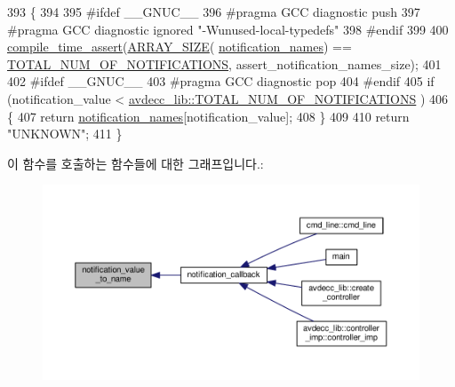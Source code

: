 \begin{DoxyCode}
393     \{
394 
395 \textcolor{preprocessor}{#ifdef \_\_GNUC\_\_}
396 \textcolor{preprocessor}{#pragma GCC diagnostic push}
397 \textcolor{preprocessor}{#pragma GCC diagnostic ignored "-Wunused-local-typedefs"}
398 \textcolor{preprocessor}{#endif}
399 
400         \hyperlink{cassert_8h_a6768e6dd0c70e296cb9d0ea13a89ec02}{compile\_time\_assert}(\hyperlink{cassert_8h_a6242a25f9d996f0cc4f4cdb911218b75}{ARRAY\_SIZE}(
      \hyperlink{namespaceavdecc__lib_1_1utility_a0ac9ebfa3d02f075ec4fbfc360dae4ee}{notification\_names}) == \hyperlink{namespaceavdecc__lib_ad2a3e740ca3019cf9fd0f9514afb6419a8b2d9a6d1dd9e32330f819a39409b09e}{TOTAL\_NUM\_OF\_NOTIFICATIONS}, 
      assert\_notification\_names\_size);
401 
402 \textcolor{preprocessor}{#ifdef \_\_GNUC\_\_}
403 \textcolor{preprocessor}{#pragma GCC diagnostic pop}
404 \textcolor{preprocessor}{#endif}
405         \textcolor{keywordflow}{if} (notification\_value < \hyperlink{namespaceavdecc__lib_ad2a3e740ca3019cf9fd0f9514afb6419a8b2d9a6d1dd9e32330f819a39409b09e}{avdecc\_lib::TOTAL\_NUM\_OF\_NOTIFICATIONS}
      )
406         \{
407             \textcolor{keywordflow}{return} \hyperlink{namespaceavdecc__lib_1_1utility_a0ac9ebfa3d02f075ec4fbfc360dae4ee}{notification\_names}[notification\_value];
408         \}
409 
410         \textcolor{keywordflow}{return} \textcolor{stringliteral}{"UNKNOWN"};
411     \}
\end{DoxyCode}


이 함수를 호출하는 함수들에 대한 그래프입니다.\+:
\nopagebreak
\begin{figure}[H]
\begin{center}
\leavevmode
\includegraphics[width=350pt]{namespaceavdecc__lib_1_1utility_a8b711a8b94eb1be638675a9e0c97d404_icgraph}
\end{center}
\end{figure}




